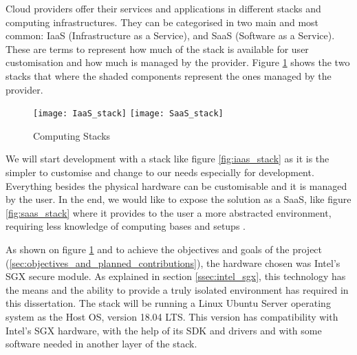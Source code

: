 Cloud providers offer their services and applications in different stacks and computing infrastructures. They can be categorised in two main and most common: \gls{IaaS} (Infrastructure as a Service), and \gls{SaaS} (Software as a Service). These are terms to represent how much of the stack is available for user customisation and how much is managed by the provider. Figure \ref{fig:computing_stacks} shows the two stacks that where the shaded components represent the ones managed by the provider.

\begin{figure}[htbp]
  \centering
    {\texttt{[image: IaaS\_stack]}}%
    \hspace{5em}
    {\texttt{[image: SaaS\_stack]}}%
  \caption{Computing Stacks}
  \label{fig:computing_stacks}
\end{figure}

We will start development with a stack like figure \ref{fig:iaas_stack} as it is the simpler to customise and change to our needs especially for development. Everything besides the physical hardware can be customisable and it is managed by the user. In the end, we would like to expose the solution as a \gls{SaaS}, like figure \ref{fig:saas_stack} where it provides to the user a more abstracted environment, requiring less knowledge of computing bases and setups \cite{computing_stacks:1}.

As shown on figure \ref{fig:computing_stacks} and to achieve the objectives and goals of the project (\ref{sec:objectives_and_planned_contributions}), the hardware chosen was Intel's \gls{SGX} secure module. As explained in section \ref{ssec:intel_sgx}, this technology has the means and the ability to provide a truly isolated environment has required in this dissertation. The stack will be running a Linux Ubuntu Server \cite{ubuntu_server:1} operating system as the Host \gls{OS}, version 18.04 LTS. This version has compatibility with Intel's \gls{SGX} hardware, with the help of its \gls{SDK} and drivers \cite{sgx_sdk:1, sgx_drivers:1} and with some software needed in another layer of the stack.

